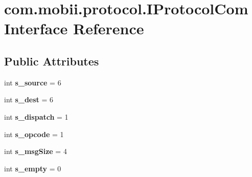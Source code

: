 \hypertarget{interfacecom_1_1mobii_1_1protocol_1_1_i_protocol_com}{\section{com.\-mobii.\-protocol.\-I\-Protocol\-Com Interface Reference}
\label{interfacecom_1_1mobii_1_1protocol_1_1_i_protocol_com}
}
\subsection*{Public Attributes}
\begin{DoxyCompactItemize}
\item 
\hypertarget{interfacecom_1_1mobii_1_1protocol_1_1_i_protocol_com_a579929ef117c950f1ce2a0e3fc91768a}{int {\bfseries s\-\_\-source} = 6}\label{interfacecom_1_1mobii_1_1protocol_1_1_i_protocol_com_a579929ef117c950f1ce2a0e3fc91768a}

\item 
\hypertarget{interfacecom_1_1mobii_1_1protocol_1_1_i_protocol_com_afb30382e7b7aa0a695bf6d42f3a70273}{int {\bfseries s\-\_\-dest} = 6}\label{interfacecom_1_1mobii_1_1protocol_1_1_i_protocol_com_afb30382e7b7aa0a695bf6d42f3a70273}

\item 
\hypertarget{interfacecom_1_1mobii_1_1protocol_1_1_i_protocol_com_aa630f9f17f5015d0eb029d46ab4623f1}{int {\bfseries s\-\_\-dispatch} = 1}\label{interfacecom_1_1mobii_1_1protocol_1_1_i_protocol_com_aa630f9f17f5015d0eb029d46ab4623f1}

\item 
\hypertarget{interfacecom_1_1mobii_1_1protocol_1_1_i_protocol_com_a687f779599483b313ef78117c5ba9f95}{int {\bfseries s\-\_\-opcode} = 1}\label{interfacecom_1_1mobii_1_1protocol_1_1_i_protocol_com_a687f779599483b313ef78117c5ba9f95}

\item 
\hypertarget{interfacecom_1_1mobii_1_1protocol_1_1_i_protocol_com_aba51b58a8911a91b46d647e40bb99caa}{int {\bfseries s\-\_\-msg\-Size} = 4}\label{interfacecom_1_1mobii_1_1protocol_1_1_i_protocol_com_aba51b58a8911a91b46d647e40bb99caa}

\item 
\hypertarget{interfacecom_1_1mobii_1_1protocol_1_1_i_protocol_com_a469300b5cd7f2a1cd99fdd70e375df00}{int {\bfseries s\-\_\-empty} = 0}\label{interfacecom_1_1mobii_1_1protocol_1_1_i_protocol_com_a469300b5cd7f2a1cd99fdd70e375df00}


\end{DoxyCompactItemize}
